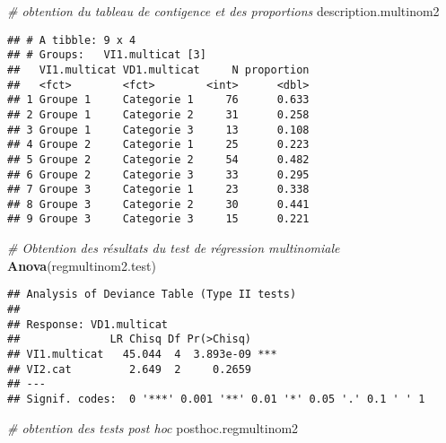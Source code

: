 \documentclass[
]{book}
\newenvironment{Shaded}{\begin{snugshade}}{\end{snugshade}}
\newcommand{\CommentTok}[1]{\textcolor[rgb]{0.56,0.35,0.01}{\textit{#1}}}
\newcommand{\KeywordTok}[1]{\textcolor[rgb]{0.13,0.29,0.53}{\textbf{#1}}}
\newcommand{\NormalTok}[1]{#1}
\begin{document}
\begin{Shaded}
\begin{Highlighting}[]
\CommentTok{# obtention du tableau de contigence et des proportions  }
\NormalTok{description.multinom2}
\end{Highlighting}
\end{Shaded}

\begin{verbatim}
## # A tibble: 9 x 4
## # Groups:   VI1.multicat [3]
##   VI1.multicat VD1.multicat     N proportion
##   <fct>        <fct>        <int>      <dbl>
## 1 Groupe 1     Categorie 1     76      0.633
## 2 Groupe 1     Categorie 2     31      0.258
## 3 Groupe 1     Categorie 3     13      0.108
## 4 Groupe 2     Categorie 1     25      0.223
## 5 Groupe 2     Categorie 2     54      0.482
## 6 Groupe 2     Categorie 3     33      0.295
## 7 Groupe 3     Categorie 1     23      0.338
## 8 Groupe 3     Categorie 2     30      0.441
## 9 Groupe 3     Categorie 3     15      0.221
\end{verbatim}

\begin{Shaded}
\begin{Highlighting}[]
\CommentTok{# Obtention des résultats du test de régression multinomiale}
\KeywordTok{Anova}\NormalTok{(regmultinom2.test)}
\end{Highlighting}
\end{Shaded}

\begin{verbatim}
## Analysis of Deviance Table (Type II tests)
## 
## Response: VD1.multicat
##              LR Chisq Df Pr(>Chisq)    
## VI1.multicat   45.044  4  3.893e-09 ***
## VI2.cat         2.649  2     0.2659    
## ---
## Signif. codes:  0 '***' 0.001 '**' 0.01 '*' 0.05 '.' 0.1 ' ' 1
\end{verbatim}

\begin{Shaded}
\begin{Highlighting}[]
\CommentTok{# obtention des tests post hoc }
\NormalTok{posthoc.regmultinom2}
\end{Highlighting}
\end{Shaded}
\end{document}
